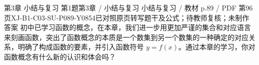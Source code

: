 \par\noindent\begin{minipage}{\linewidth}
\begin{bankitem}{第3章 小结与复习 第1题}{第3章 / 小结与复习 小结与复习 / 教材 p.89 / PDF 第96页}{XJ-B1-C03-SU-P089-Y0854}{已对照原页转写题干及公式；待教师复核；未制作答案}
初中已学习函数的概念，在本章，我们进一步用更加严谨的集合和对应语言来刻画函数，突出了函数概念的本质是一个数集到另一个数集的一种确定的对应关系，明确了构成函数的要素，并引入函数符号 $y=f(x)$。通过本章的学习，你对函数概念有什么新的认识和体会吗？
\end{bankitem}
\end{minipage}\par\medskip
